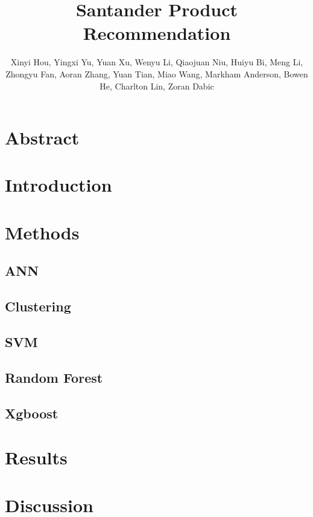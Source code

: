\documentclass{article}
\begin{document}
	
\title{Santander Product Recommendation}

\author{Xinyi Hou,
	Yingxi Yu,
	Yuan Xu,
	Wenyu Li,
	Qiaojuan Niu,
	Huiyu Bi,
	Meng Li,
	Zhongyu Fan,
	Aoran Zhang,
	Yuan Tian,
	Miao Wang,
	Markham Anderson,
	Bowen He,
	Charlton Lin,
	Zoran Dabic}

\section{Abstract}

\section{Introduction}

\section{Methods}

\subsection{ANN}

\subsection{Clustering}

\subsection{SVM}

\subsection{Random Forest}

\subsection{Xgboost}

\section{Results}

\section{Discussion}
\end{document}
